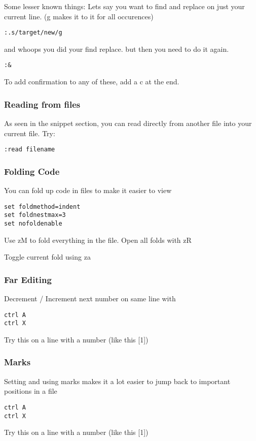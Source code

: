 \documentclass[12pt, letterpaper]{article}
\begin{document}
Some lesser known things:
Lets say you want to find and replace on just your current line. (g makes it to
it for all occurences)
\begin{verbatim}
:.s/target/new/g
\end{verbatim}
and whoops you did your find replace. but then you need to do it again.
\begin{verbatim}
:&
\end{verbatim}

To add confirmation to any of these, add a c at the end.


\subsubsection{Reading from files}
As seen in the snippet section, you can read directly from another file into
your current file. Try:

\begin{verbatim}
:read filename
\end{verbatim}

\subsubsection{Folding Code}
You can fold up code in files to make it easier to view
\begin{verbatim}
set foldmethod=indent
set foldnestmax=3
set nofoldenable
\end{verbatim}
Use zM to fold everything in the file. Open all folds with zR

Toggle current fold using za

\subsubsection{Far Editing}
Decrement / Increment next number on same line with 
\begin{verbatim}
ctrl A
ctrl X
\end{verbatim}
Try this on a line with a number (like this [1])

\subsubsection{Marks}
Setting and using marks makes it a lot easier to jump back to important
positions in a file
\begin{verbatim}
ctrl A
ctrl X
\end{verbatim}
Try this on a line with a number (like this [1])
\end{document}
